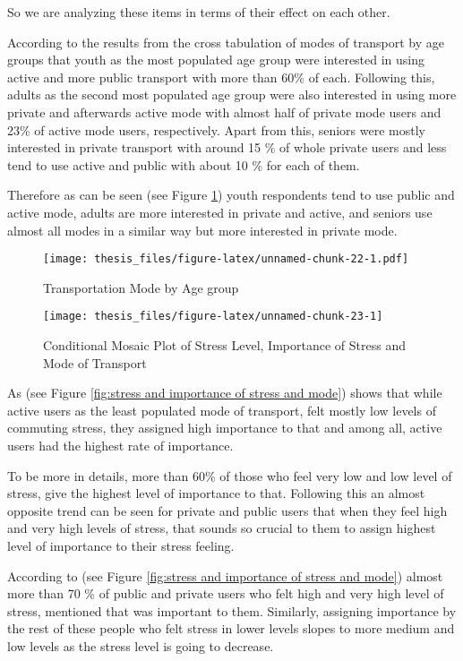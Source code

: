 \documentclass[
11pt, %
oneside, %
english, %
singlespacing, %
]{macthesis} %
\begin{document}
So we are analyzing these items in terms of their effect on each other.

According to the results from the cross tabulation of modes of transport by age groups that youth as the most populated age group were interested in using active and more public transport with more than 60\% of each. Following this, adults as the second most populated age group were also interested in using more private and afterwards active mode with almost half of private mode users and 23\% of active mode users, respectively. Apart from this, seniors were mostly interested in private transport with around 15 \% of whole private users and less tend to use active and public with about 10 \% for each of them.

Therefore as can be seen (see Figure \ref{fig:Transportation Mode by Age group}) youth respondents tend to use public and active mode, adults are more interested in private and active, and seniors use almost all modes in a similar way but more interested in private mode.
\begin{figure}
\centering
\texttt{[image: thesis\_files/figure-latex/unnamed-chunk-22-1.pdf]}
\caption{\label{fig:unnamed-chunk-22}\label{fig:Transportation Mode by Age group}Transportation Mode by Age group}
\end{figure}
\begin{figure}

{\centering \texttt{[image: thesis\_files/figure-latex/unnamed-chunk-23-1]} 

}

\caption{\label{fig:stress and importance of stress and mode}Conditional Mosaic Plot of Stress Level, Importance of Stress and Mode of Transport}\label{fig:unnamed-chunk-23}
\end{figure}
As (see Figure \ref{fig:stress and importance of stress and mode}) shows that while active users as the least populated mode of transport, felt mostly low levels of commuting stress, they assigned high importance to that and among all, active users had the highest rate of importance.

To be more in details, more than 60\% of those who feel very low and low level of stress, give the highest level of importance to that. Following this an almost opposite trend can be seen for private and public users that when they feel high and very high levels of stress, that sounds so crucial to them to assign highest level of importance to their stress feeling.

According to (see Figure \ref{fig:stress and importance of stress and mode}) almost more than 70 \% of public and private users who felt high and very high level of stress, mentioned that was important to them. Similarly, assigning importance by the rest of these people who felt stress in lower levels slopes to more medium and low levels as the stress level is going to decrease.
\end{document}
